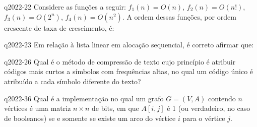 \documentclass[10pt,a4paper]{article}
\begin{document}
{
\def\AMCbeginQuestion#1#2{\par\noindent{\bf (POSCOMP 2022 - Questão 22)}}
\begin{question}{q2022-22} Considere as funções a seguir: $f_1(n) = O(n)$, $f_2(n) = O(n!)$, $f_3(n) = O(2^n)$, $f_4(n) = O(n^2)$. A ordem dessas funções, por ordem crescente de taxa de crescimento, é:
\begin{choices}
\end{choices}
\end{question}
}

{
\def\AMCbeginQuestion#1#2{\par\noindent{\bf (POSCOMP 2022 - Questão 23)}}
\begin{question}{q2022-23} Em relação à lista linear em alocação sequencial, é correto afirmar que:
\begin{choices}
\end{choices}
\end{question}
}

{
\def\AMCbeginQuestion#1#2{\par\noindent{\bf (POSCOMP 2022 - Questão 26)}}
\begin{question}{q2022-26} Qual é o método de compressão de texto cujo princípio é atribuir códigos mais curtos a símbolos com frequências altas, no qual um código único é atribuído a cada símbolo diferente do texto?
\begin{choices}
\end{choices}
\end{question}
}

{
\def\AMCbeginQuestion#1#2{\par\noindent{\bf (POSCOMP 2022 - Questão 36)}}
\begin{question}{q2022-36} Qual é a implementação no qual um grafo $G = (V,A)$ contendo $n$ vértices é uma matriz $n \times n$ de bits, em que $A[i,j]$ é 1 (ou verdadeiro, no caso de booleanos) se e somente se existe um arco do vértice $i$ para o vértice $j$.
\begin{choices}
\end{choices}
\end{question}
}
\end{document}
